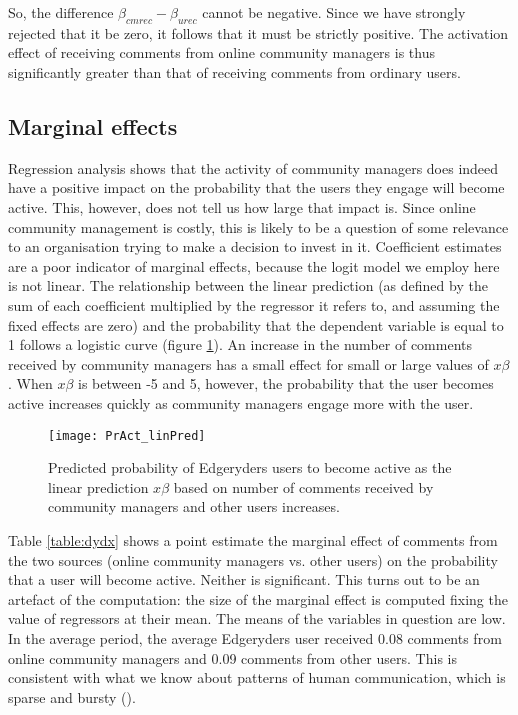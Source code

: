 So, the difference $\beta_{cmrec} - \beta_{urec}$ cannot be negative. Since we have strongly rejected that it be zero, it follows that it must be strictly positive. The activation effect of receiving comments from online community managers is thus significantly greater than that of receiving comments from ordinary users.

\subsection{Marginal effects}

Regression analysis shows that the activity of community managers does indeed have a positive impact on the probability that the users they engage will become active. This, however, does not tell us how large that impact is. Since online community management is costly, this is likely to be a question of some relevance to an organisation trying to make a decision to invest in it. 
Coefficient estimates are a poor indicator of marginal effects, because the logit model we employ here is not linear. The relationship between the linear prediction (as defined by the sum of each coefficient multiplied by the regressor it refers to, and assuming the fixed effects are zero) and the probability that the dependent variable is equal to 1 follows a logistic curve (figure \ref{fig:probActivityLinPredict}). An increase in the number of comments received by community managers has a small effect for small or large values of $x\beta$. When $x\beta$ is between -5 and 5, however, the probability that the user becomes active increases quickly as community managers engage more with the user.

\begin{figure}
	\texttt{[image: PrAct\_linPred]}
	\caption{Predicted probability of Edgeryders users to become active as the linear prediction $x\beta$ based on number of comments received by community managers and other users increases.}
\label{fig:probActivityLinPredict}
\end{figure}

Table \ref{table:dydx} shows a point estimate the marginal effect of comments from the two sources (online community managers vs. other users) on the probability that a user will become active. Neither is significant. This turns out to be an artefact of the computation: the size of the marginal effect is computed fixing the value of regressors at their mean. The means of the variables in question are low. In the average period, the average Edgeryders user received 0.08 comments from online community managers and 0.09 comments from other users. This is consistent with what we know about patterns of human communication, which is sparse and bursty (\cite{holme2012temporal}). 

